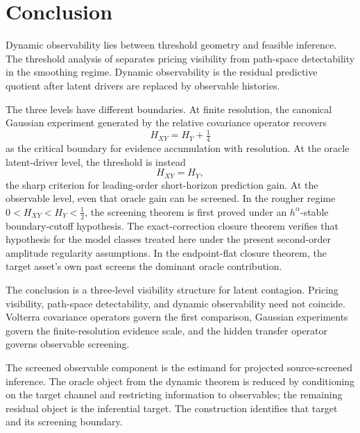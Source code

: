 \documentclass[11pt,a4paper]{amsart}
\theoremstyle{plain}
\theoremstyle{definition}
\theoremstyle{remark}
\begin{document}
\section{Conclusion}\label{sec:conclusion}

Dynamic observability lies between threshold geometry and feasible inference.  The threshold analysis
of \cite{vidal2026latent} separates pricing visibility from path-space detectability in the
smoothing regime.  Dynamic observability is the residual predictive quotient after latent drivers
are replaced by observable histories.

The three levels have different boundaries.  At finite resolution, the canonical Gaussian experiment
generated by the relative covariance operator recovers
\[
H_{XY}=H_Y+\tfrac14
\]
as the critical boundary for evidence accumulation with resolution.  At the oracle latent-driver
level, the threshold is instead
\[
H_{XY}=H_Y,
\]
the sharp criterion for leading-order short-horizon prediction gain.  At the observable level, even
that oracle gain can be screened.  In the rougher regime \(0<H_{XY}<H_Y<\tfrac12\), the screening
theorem is first proved under an \(h^\alpha\)-stable boundary-cutoff hypothesis.  The
exact-correction closure theorem verifies that hypothesis for the model classes treated here under
the present second-order amplitude regularity assumptions.  In the endpoint-flat closure theorem,
the target asset's own past screens the dominant oracle contribution.

The conclusion is a three-level visibility structure for latent contagion.  Pricing visibility,
path-space detectability, and dynamic observability need not coincide.  Volterra covariance
operators govern the first comparison, Gaussian experiments govern the finite-resolution evidence
scale, and the hidden transfer operator governs observable screening.

The screened observable component is the estimand for projected source-screened inference.  The
oracle object from the dynamic theorem is reduced by conditioning on the target channel and
restricting information to observables; the remaining residual object is the inferential target.
The construction identifies that target and its screening boundary.
\end{document}
